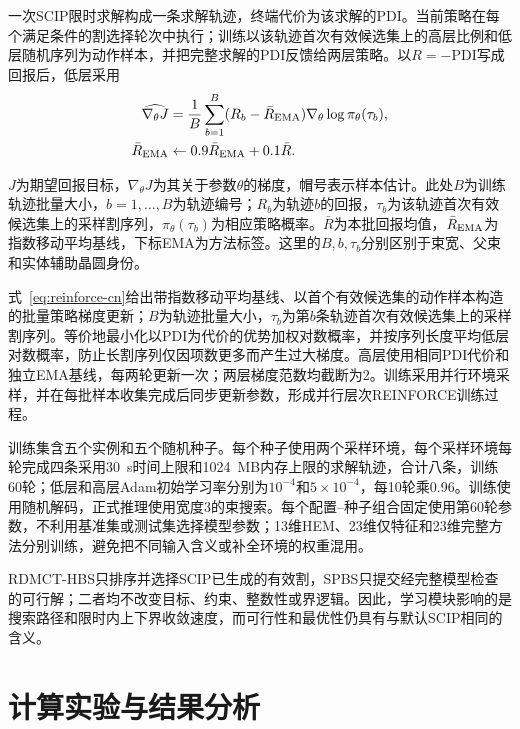 \documentclass[final,5p,times,twocolumn]{elsarticle}
\newcommand{\method}{RDMCT-HBS}
\newcommand{\pdi}{\mathrm{PDI}}
\begin{document}
一次SCIP限时求解构成一条求解轨迹，终端代价为该求解的PDI。当前策略在每个满足条件的割选择轮次中执行；训练以该轨迹首次有效候选集上的高层比例和低层随机序列为动作样本，并把完整求解的PDI反馈给两层策略。以$R=-\pdi$写成回报后，低层采用
\begin{equation}
\begin{aligned}
\widehat{\nabla_\theta J}
&=\frac1B\sum_{b=1}^B(R_b-\bar R_{\rm EMA})
\nabla_\theta\log\pi_\theta(\tau_b),\\
\bar R_{\rm EMA}&\leftarrow0.9\bar R_{\rm EMA}+0.1\bar R.
\end{aligned}
\label{eq:reinforce-cn}
\end{equation}

$J$为期望回报目标，$\nabla_\theta J$为其关于参数$\theta$的梯度，帽号表示样本估计。此处$B$为训练轨迹批量大小，$b=1,\ldots,B$为轨迹编号；$R_b$为轨迹$b$的回报，$\tau_b$为该轨迹首次有效候选集上的采样割序列，$\pi_\theta(\tau_b)$为相应策略概率。$\bar R$为本批回报均值，$\bar R_{\rm EMA}$为指数移动平均基线，下标EMA为方法标签。这里的$B,b,\tau_b$分别区别于束宽、父束和实体辅助晶圆身份。


式~\eqref{eq:reinforce-cn}给出带指数移动平均基线、以首个有效候选集的动作样本构造的批量策略梯度更新；$B$为轨迹批量大小，$\tau_b$为第$b$条轨迹首次有效候选集上的采样割序列。等价地最小化以PDI为代价的优势加权对数概率，并按序列长度平均低层对数概率，防止长割序列仅因项数更多而产生过大梯度。高层使用相同PDI代价和独立EMA基线，每两轮更新一次；两层梯度范数均截断为2。训练采用并行环境采样，并在每批样本收集完成后同步更新参数，形成并行层次REINFORCE训练过程\citep{williams1992reinforce,mnih2016a3c}。

训练集含五个实例和五个随机种子。每个种子使用两个采样环境，每个采样环境每轮完成四条采用30~s时间上限和1024~MB内存上限的求解轨迹，合计八条，训练60轮；低层和高层Adam初始学习率分别为$10^{-4}$和$5\times10^{-4}$，每10轮乘0.96。训练使用随机解码，正式推理使用宽度3的束搜索。每个配置--种子组合固定使用第60轮参数，不利用基准集或测试集选择模型参数；13维HEM、23维仅特征和23维完整方法分别训练，避免把不同输入含义或补全环境的权重混用。

\method{}只排序并选择SCIP已生成的有效割，SPBS只提交经完整模型检查的可行解；二者均不改变目标、约束、整数性或界逻辑。因此，学习模块影响的是搜索路径和限时内上下界收敛速度，而可行性和最优性仍具有与默认SCIP相同的含义。

\section{计算实验与结果分析}
\end{document}
